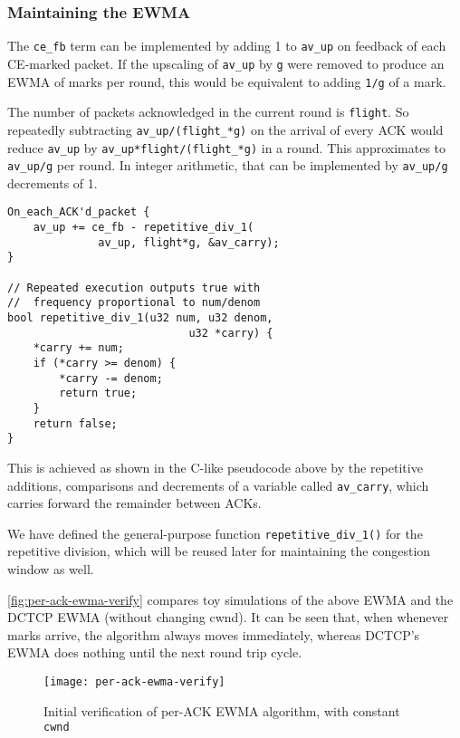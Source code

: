 \subsubsection{Maintaining the EWMA}

The \texttt{ce\_fb} term can be implemented by adding 1 to \texttt{av\_up} on feedback of each CE-marked packet. If the upscaling of \texttt{av\_up} by \texttt{g} were removed to produce an EWMA of marks per round, this would be equivalent to adding \texttt{1/g} of a mark.

The number of packets acknowledged in the current round is \texttt{flight}. So repeatedly subtracting \texttt{av\_up/(flight\_*g)} on the arrival of every ACK would reduce \texttt{av\_up} by \texttt{av\_up*flight/(flight\_*g)} in a round. This approximates to \texttt{av\_up/g} per round. In integer arithmetic, that can be implemented by \texttt{av\_up/g} decrements of 1. 

\begin{verbatim}
On_each_ACK'd_packet {
    av_up += ce_fb - repetitive_div_1(
              av_up, flight*g, &av_carry);
}

// Repeated execution outputs true with 
//  frequency proportional to num/denom
bool repetitive_div_1(u32 num, u32 denom, 
                            u32 *carry) {
    *carry += num;
    if (*carry >= denom) {
        *carry -= denom;
        return true;
    }
    return false;
}
\end{verbatim}

This is achieved as shown %
in the C-like pseudocode above by the repetitive additions, comparisons and decrements of a variable called \texttt{av\_carry}, which carries forward the remainder between ACKs. 

We have defined the general-purpose function \texttt{repetitive\_div\_1()} for the repetitive division, which will be reused later for maintaining the congestion window as well.

\autoref{fig:per-ack-ewma-verify} compares toy simulations of the above EWMA and the DCTCP EWMA (without changing cwnd). It can be seen that, when whenever marks arrive, the algorithm always moves immediately, whereas DCTCP's EWMA does nothing until the next round trip cycle.
\begin{figure}[h]
	\texttt{[image: per-ack-ewma-verify]}
	\caption{Initial verification of per-ACK EWMA algorithm, with constant \texttt{cwnd}}\label{fig:per-ack-ewma-verify}
\end{figure}

